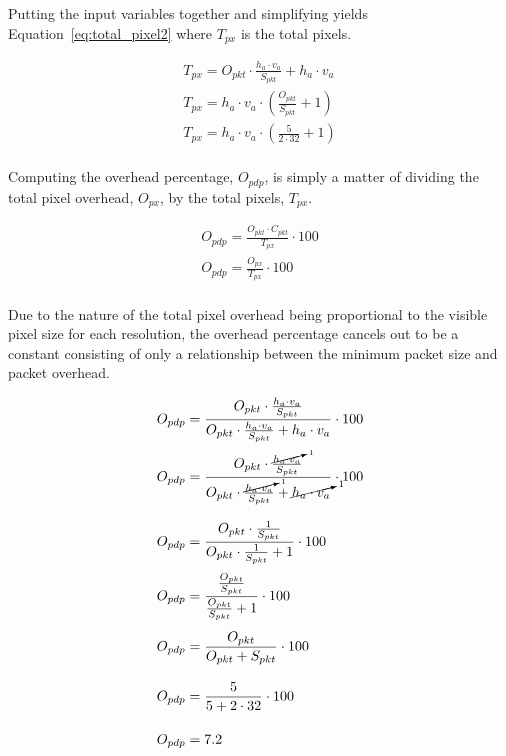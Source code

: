     Putting the input variables together and simplifying yields Equation~\eqref{eq:total_pixel2} where $T_{px}$ is the total pixels.

    \begin{equation}
        \begin{array}{ l }
            \displaystyle T_{px}=O_{pkt} \cdot \frac{h_a \cdot v_a}{S_{pkt}} + h_a \cdot v_a \\[13pt]
            \displaystyle T_{px}=h_a \cdot v_a \cdot (\frac{O_{pkt}}{S_{pkt}} + 1) \\[13pt]
            \displaystyle T_{px}=h_a \cdot v_a \cdot (\frac{5}{2 \cdot 32} + 1) \\[13pt]
        \end{array}
        \label{eq:total_pixel2}
    \end{equation}

    Computing the overhead percentage, $O_{pdp}$, is simply a matter of dividing the total pixel overhead, $O_{px}$, by the total pixels, $T_{px}$.

    \begin{equation}
        \begin{array}{ l }
            \displaystyle O_{pdp}=\frac{O_{pkt}\cdot C_{pkt}}{T_{px}} \cdot 100 \\[13pt]
            \displaystyle O_{pdp}=\frac{O_{px}}{T_{px}} \cdot 100 \\[13pt]
        \end{array}
        \label{eq:overhead}
    \end{equation}

    Due to the nature of the total pixel overhead being proportional to the visible pixel size for each resolution, the overhead percentage cancels out to be a constant consisting of only a relationship between the minimum packet size and packet overhead.

    \begin{equation}
        \begin{array}{ l }
            \displaystyle O_{pdp}=\frac{O_{pkt}\cdot \frac{h_a \cdot v_a}{S_{pkt}}}{O_{pkt} \cdot \frac{h_a \cdot v_a}{S_{pkt}} + h_a \cdot v_a} \cdot 100 \\[16pt]
            \displaystyle O_{pdp}=\frac{O_{pkt}\cdot \frac{\cancelto{1}{h_a \cdot v_a}}{S_{pkt}}}{O_{pkt} \cdot \frac{\cancelto{1}{h_a \cdot v_a}}{S_{pkt}} + \cancelto{1}{h_a \cdot v_a}} \cdot 100 \\[25pt]
            \displaystyle O_{pdp}=\frac{O_{pkt}\cdot \frac{1}{S_{pkt}}}{O_{pkt} \cdot \frac{1}{S_{pkt}} + 1} \cdot 100 \\[16pt]
            \displaystyle O_{pdp}=\frac{\frac{O_{pkt}}{S_{pkt}}}{\frac{O_{pkt}}{S_{pkt}} + 1} \cdot 100 \\[19pt]
            \displaystyle O_{pdp}=\frac{O_{pkt}}{O_{pkt}+S_{pkt}} \cdot 100 \\[19pt]
            \displaystyle O_{pdp}=\frac{5}{5 + 2 \cdot 32} \cdot 100 \\[19pt]
            \displaystyle O_{pdp}=7.2 \\[13pt]
        \end{array}
        \label{eq:cancel}
    \end{equation}

